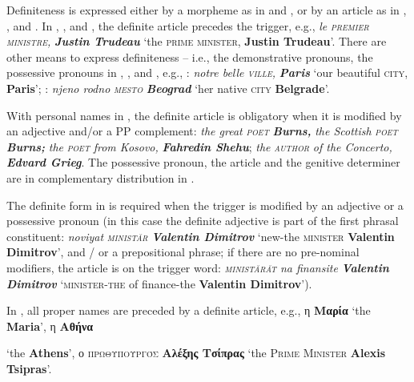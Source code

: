 \documentclass[output=paper]{langsci/langscibook}
\newcommand{\trigger}[1]{\textsc{#1}}
\begin{document}
{Definiteness is expressed either by a morpheme as in  and
, or by an article as in , , and . In ,
, and , the definite article precedes the trigger, e.g.,
\textit{le }\textit{\trigger{premier ministre}}\textit{,
}\textbf{\textit{Justin Trudeau}} ‘the \trigger{prime minister},
\textbf{Justin Trudeau}’. There are other means to express definiteness
– i.e., the demonstrative pronouns, the possessive pronouns in ,
, and , e.g., : \textit{notre belle
}\textit{\trigger{ville}}\textit{, }\textbf{\textit{Paris}} ‘our
beautiful \trigger{city}, \textbf{Paris}’; : \textit{njeno rodno
}\textit{\trigger{mesto}} \textbf{\textit{Beograd}} ‘her native
\trigger{city} \textbf{Belgrade}’.



With personal names in , the definite article is obligatory when
it is modified by an adjective and/or a PP complement: \textit{the
great }\textit{\trigger{poet}} \textbf{\textit{Burns, }}\textit{the
Scottish }\textit{\trigger{poet}}\textit{ }\textbf{\textit{Burns;}}
\textit{the }\textit{\trigger{poet}}\textit{ from Kosovo,
}\textbf{\textit{Fahredin Shehu}}; \textit{the }\textit{\trigger{author}}
\textit{of the Concerto, }\textbf{\textit{Edvard Grieg}}. The
possessive pronoun, the article and the genitive determiner are in
complementary distribution in .



The definite form in  is required when the trigger is modified
by an adjective or a possessive pronoun (in this case the definite
adjective is part of the first phrasal constituent: \textit{noviyat
}\textit{\trigger{ministăr}} \textbf{\textit{Valentin Dimitrov}} ‘new-the
\trigger{minister} \textbf{Valentin Dimitrov}’, and / or a prepositional
phrase; if there are no pre-nominal modifiers, the article is on the
trigger word: \textit{\trigger{ministărăt}} \textit{na finansite
}\textbf{\textit{Valentin Dimitrov}} ‘\trigger{minister-the} of
finance-the \textbf{Valentin Dimitrov}’).



In , all proper names are preceded by a definite article, e.g.,
η \textbf{Μαρία} ‘the \textbf{Maria}’, η
\textbf{Αθήνα}} ‘the \textbf{Athens}’, ο
\trigger{πρωθυπουργός} \textbf{Αλέξης Τσίπρας} ‘the
\trigger{Prime} \trigger{Minister} \textbf{Alexis Tsipras}’.
\end{document}
